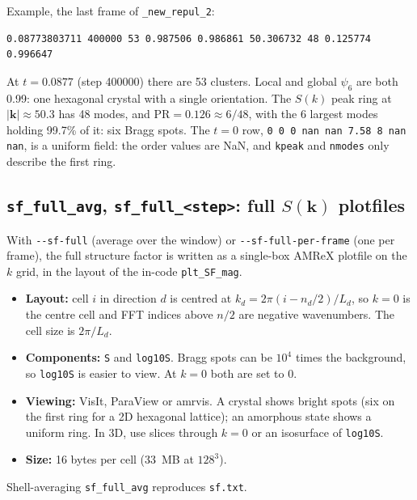 \documentclass[11pt]{article}
\newcommand{\code}[1]{\texttt{#1}}
\begin{document}
Example, the last frame of \code{\_new\_repul\_2}:
\begin{verbatim}
0.08773803711 400000 53 0.987506 0.986861 50.306732 48 0.125774 0.996647
\end{verbatim}
At $t=0.0877$ (step 400000) there are 53 clusters. Local and global $\psi_6$
are both 0.99: one hexagonal crystal with a single orientation. The $S(k)$
peak ring at $|\mathbf k|\approx50.3$ has 48 modes, and $\mathrm{PR}=0.126\approx6/48$,
with the 6 largest modes holding 99.7\% of it: six Bragg spots. The $t=0$ row,
\code{0 0 0 nan nan 7.58 8 nan nan}, is a uniform field: the order values are
NaN, and \code{kpeak} and \code{nmodes} only describe the first ring.

\subsection*{\texorpdfstring{\code{sf\_full\_avg}, \code{sf\_full\_<step>}: full $S(\mathbf k)$ plotfiles}{sf_full plotfiles}}
With \code{-{}-sf-full} (average over the window) or \code{-{}-sf-full-per-frame}
(one per frame), the full structure factor is written as a single-box AMReX
plotfile on the $k$ grid, in the layout of the in-code \code{plt\_SF\_mag}.
\begin{itemize}[nosep]
  \item \textbf{Layout:} cell $i$ in direction $d$ is centred at
        $k_d=2\pi(i-n_d/2)/L_d$, so $k=0$ is the centre cell and FFT indices
        above $n/2$ are negative wavenumbers. The cell size is $2\pi/L_d$.
  \item \textbf{Components:} \code{S} and \code{log10S}. Bragg spots can be
        $10^4$ times the background, so \code{log10S} is easier to view.
        At $k=0$ both are set to 0.
  \item \textbf{Viewing:} VisIt, ParaView or amrvis. A crystal shows bright
        spots (six on the first ring for a 2D hexagonal lattice); an
        amorphous state shows a uniform ring. In 3D, use slices through
        $k=0$ or an isosurface of \code{log10S}.
  \item \textbf{Size:} 16 bytes per cell (33~MB at $128^3$).
\end{itemize}
Shell-averaging \code{sf\_full\_avg} reproduces \code{sf.txt}.
\end{document}
